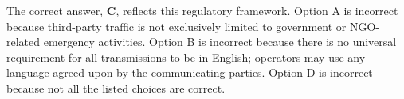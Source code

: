 The correct answer, \textbf{C}, reflects this regulatory framework. Option A is incorrect because third-party traffic is not exclusively limited to government or NGO-related emergency activities. Option B is incorrect because there is no universal requirement for all transmissions to be in English; operators may use any language agreed upon by the communicating parties. Option D is incorrect because not all the listed choices are correct.

